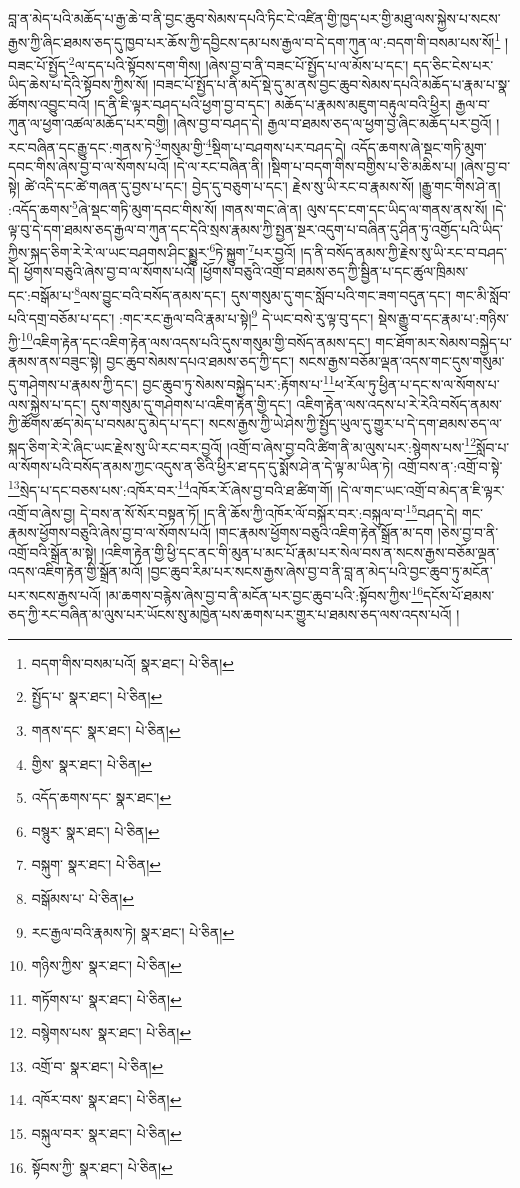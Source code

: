 བླ་ན་མེད་པའི་མཆོད་པ་རྒྱ་ཆེ་བ་ནི་བྱང་ཆུབ་སེམས་དཔའི་ཏིང་ངེ་འཛིན་གྱི་ཁྱད་པར་གྱི་མཐུ་ལས་སྐྱེས་པ་སངས་རྒྱས་ཀྱི་ཞིང་ཐམས་ཅད་དུ་ཁྱབ་པར་ཆོས་ཀྱི་དབྱིངས་དམ་པས་རྒྱལ་བ་དེ་དག་ཀུན་ལ་:བདག་གི་བསམ་པས་སོ།\footnote{བདག་གིས་བསམ་པའོ།  སྣར་ཐང་།  པེ་ཅིན། } །བཟང་པོ་སྤྱོད་\footnote{སྤྱོད་པ་  སྣར་ཐང་།  པེ་ཅིན། }ལ་དད་པའི་སྟོབས་དག་གིས། །ཞེས་བྱ་བ་ནི་བཟང་པོ་སྤྱོད་པ་ལ་མོས་པ་དང་། དད་ཅིང་ངེས་པར་ཡིད་ཆེས་པ་དེའི་སྟོབས་ཀྱིས་སོ། །བཟང་པོ་སྤྱོད་པ་ནི་མདོ་སྡེ་དུ་མ་ནས་བྱང་ཆུབ་སེམས་དཔའི་མཆོད་པ་རྣམ་པ་སྣ་ཚོགས་འབྱུང་བའོ། །ད་ནི་ཇི་ལྟར་བཤད་པའི་ཕྱག་བྱ་བ་དང་། མཆོད་པ་རྣམས་མཇུག་བརྟུལ་བའི་ཕྱིར། རྒྱལ་བ་ཀུན་ལ་ཕྱག་འཚལ་མཆོད་པར་བགྱི། །ཞེས་བྱ་བ་བཤད་དེ། རྒྱལ་བ་ཐམས་ཅད་ལ་ཕྱག་བྱ་ཞིང་མཆོད་པར་བྱའོ། །རང་བཞིན་དང་རྒྱུ་དང་:གནས་ཏེ་\footnote{གནས་དང་  སྣར་ཐང་།  པེ་ཅིན། }གསུམ་གྱི་\footnote{གྱིས་  སྣར་ཐང་།  པེ་ཅིན། }སྡིག་པ་བཤགས་པར་བཤད་དེ། འདོད་ཆགས་ཞེ་སྡང་གཏི་མུག་དབང་གིས་ཞེས་བྱ་བ་ལ་སོགས་པའོ། །དེ་ལ་རང་བཞིན་ནི། །སྡིག་པ་བདག་གིས་བགྱིས་པ་ཅི་མཆིས་པ། །ཞེས་བྱ་བ་སྟེ། ཚེ་འདི་དང་ཚེ་གཞན་དུ་བྱས་པ་དང་། བྱེད་དུ་བཅུག་པ་དང་། རྗེས་སུ་ཡི་རང་བ་རྣམས་སོ། །རྒྱུ་གང་གིས་ཤེ་ན། :འདོད་ཆགས་\footnote{འདོད་ཆགས་དང་  སྣར་ཐང་། }ཞེ་སྡང་གཏི་མུག་དབང་གིས་སོ། །གནས་གང་ཞེ་ན། ལུས་དང་ངག་དང་ཡིད་ལ་གནས་ནས་སོ། །དེ་ལྟ་བུ་དེ་དག་ཐམས་ཅད་རྒྱལ་བ་ཀུན་དང་དེའི་སྲས་རྣམས་ཀྱི་སྤྱན་སྔར་འདུག་པ་བཞིན་དུ་ཤིན་ཏུ་འགྱོད་པའི་ཡིད་ཀྱིས་སྐད་ཅིག་རེ་རེ་ལ་ཡང་བཤགས་ཤིང་སྨྱུར་\footnote{བསྙུར་  སྣར་ཐང་།  པེ་ཅིན། }ཏེ་སྐྱུག་\footnote{བསྐུག་  སྣར་ཐང་།  པེ་ཅིན། }པར་བྱའོ། །ད་ནི་བསོད་ནམས་ཀྱི་རྗེས་སུ་ཡི་རང་བ་བཤད་དེ། ཕྱོགས་བཅུའི་ཞེས་བྱ་བ་ལ་སོགས་པའོ། །ཕྱོགས་བཅུའི་འགྲོ་བ་ཐམས་ཅད་ཀྱི་སྦྱིན་པ་དང་ཚུལ་ཁྲིམས་དང་:བསྒོམ་པ་\footnote{བསྒོམས་པ་  པེ་ཅིན། }ལས་བྱུང་བའི་བསོད་ནམས་དང་། དུས་གསུམ་དུ་གང་སློབ་པའི་གང་ཟག་བདུན་དང་། གང་མི་སློབ་པའི་དགྲ་བཅོམ་པ་དང་། :གང་རང་རྒྱལ་བའི་རྣམ་པ་སྟེ།\footnote{རང་རྒྱལ་བའི་རྣམས་ཏེ།  སྣར་ཐང་།  པེ་ཅིན། } དེ་ཡང་བསེ་རུ་ལྟ་བུ་དང་། སྡེས་རྒྱུ་བ་དང་རྣམ་པ་:གཉིས་ཀྱི་\footnote{གཉིས་ཀྱིས་  སྣར་ཐང་།  པེ་ཅིན། }འཇིག་རྟེན་དང་འཇིག་རྟེན་ལས་འདས་པའི་དུས་གསུམ་གྱི་བསོད་ནམས་དང་། གང་ཐོག་མར་སེམས་བསྐྱེད་པ་རྣམས་ནས་བཟུང་སྟེ། བྱང་ཆུབ་སེམས་དཔའ་ཐམས་ཅད་ཀྱི་དང་། སངས་རྒྱས་བཅོམ་ལྡན་འདས་གང་དུས་གསུམ་དུ་གཤེགས་པ་རྣམས་ཀྱི་དང་། བྱང་ཆུབ་ཏུ་སེམས་བསྐྱེད་པར་:རྟོགས་པ་\footnote{གཏོགས་པ་  སྣར་ཐང་།  པེ་ཅིན། }ཕ་རོལ་ཏུ་ཕྱིན་པ་དང་ས་ལ་སོགས་པ་ལས་སྐྱེས་པ་དང་། དུས་གསུམ་དུ་གཤེགས་པ་འཇིག་རྟེན་གྱི་དང་། འཇིག་རྟེན་ལས་འདས་པ་རེ་རེའི་བསོད་ནམས་ཀྱི་ཚོགས་ཚད་མེད་པ་བསམ་དུ་མེད་པ་དང་། སངས་རྒྱས་ཀྱི་ཡེ་ཤེས་ཀྱི་སྤྱོད་ཡུལ་དུ་གྱུར་པ་དེ་དག་ཐམས་ཅད་ལ་སྐད་ཅིག་རེ་རེ་ཞིང་ཡང་རྗེས་སུ་ཡི་རང་བར་བྱའོ། །འགྲོ་བ་ཞེས་བྱ་བའི་ཚིག་ནི་མ་ལུས་པར་:སྙེགས་པས་\footnote{བསྙེགས་པས་  སྣར་ཐང་།  པེ་ཅིན། }སློབ་པ་ལ་སོགས་པའི་བསོད་ནམས་ཀྱང་འདུས་ན་ཅིའི་ཕྱིར་ཐ་དད་དུ་སྨོས་ཤེ་ན་དེ་ལྟ་མ་ཡིན་ཏེ། འགྲོ་བས་ན་:འགྲོ་བ་སྟེ་\footnote{འགྲོ་བ་  སྣར་ཐང་།  པེ་ཅིན། }སྲེད་པ་དང་བཅས་པས་:འཁོར་བར་\footnote{འཁོར་བས་  སྣར་ཐང་།  པེ་ཅིན། }འཁོར་རོ་ཞེས་བྱ་བའི་ཐ་ཚིག་གོ། །དེ་ལ་གང་ཡང་འགྲོ་བ་མེད་ན་ཇི་ལྟར་འགྲོ་བ་ཞེས་བྱ། དེ་བས་ན་སོ་སོར་བསྟན་ཏོ། །ད་ནི་ཆོས་ཀྱི་འཁོར་ལོ་བསྐོར་བར་:བསྐུལ་བ་\footnote{བསྐུལ་བར་  སྣར་ཐང་།  པེ་ཅིན། }བཤད་དེ། གང་རྣམས་ཕྱོགས་བཅུའི་ཞེས་བྱ་བ་ལ་སོགས་པའོ། །གང་རྣམས་ཕྱོགས་བཅུའི་འཇིག་རྟེན་སྒྲོན་མ་དག །ཅེས་བྱ་བ་ནི་འགྲོ་བའི་སྒྲོན་མ་སྟེ། །འཇིག་རྟེན་གྱི་ཕྱི་དང་ནང་གི་མུན་པ་མང་པོ་རྣམ་པར་སེལ་བས་ན་སངས་རྒྱས་བཅོམ་ལྡན་འདས་འཇིག་རྟེན་གྱི་སྒྲོན་མའོ། །བྱང་ཆུབ་རིམ་པར་སངས་རྒྱས་ཞེས་བྱ་བ་ནི་བླ་ན་མེད་པའི་བྱང་ཆུབ་ཏུ་མངོན་པར་སངས་རྒྱས་པའོ། །མ་ཆགས་བརྙེས་ཞེས་བྱ་བ་ནི་མངོན་པར་བྱང་ཆུབ་པའི་:སྟོབས་ཀྱིས་\footnote{སྟོབས་ཀྱི་  སྣར་ཐང་།  པེ་ཅིན། }དངོས་པོ་ཐམས་ཅད་ཀྱི་རང་བཞིན་མ་ལུས་པར་ཡོངས་སུ་མཁྱེན་པས་ཆགས་པར་གྱུར་པ་ཐམས་ཅད་ལས་འདས་པའོ། །
